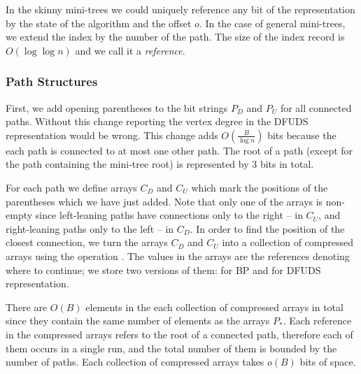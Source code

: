 In the skinny mini-trees we could uniquely reference any bit of the representation by the state of the algorithm and the offset $o$.
In the case of general mini-trees, we extend the index by the number of the path.
The size of the index record is $O(\log \log n)$ and we call it a \emph{reference}.

\subsubsection{Path Structures}

First, we add opening parentheses to the bit strings $P_D$ and $P_U$ for all connected paths.
Without this change reporting the vertex degree in the DFUDS representation would be wrong.
This change adds $O(\frac{B}{\log n})$ bits because the each path is connected to at most one other path.
The root of a path (except for the path containing the mini-tree root) is represented by $3$ bits in total.

For each path we define arrays $C_D$ and $C_U$ which mark the positions of the parentheses which we have just added.
Note that only one of the arrays is non-empty since left-leaning paths have connections only to the right -- in $C_U$, and right-leaning paths only to the left -- in $C_D$.
In order to find the position of the closest connection, we turn the arrays $C_D$ and $C_U$ into a collection of compressed arrays using the operation \succ{}.
The values in the arrays are the references denoting where to continue; we store two versions of them: for BP and for DFUDS representation.

There are $O(B)$ elements in the each collection of compressed arrays in total since they contain the same number of elements as the arrays $P_*$.
Each reference in the compressed arrays refers to the root of a connected path, therefore each of them occurs in a single run, and the total number of them is bounded by the number of paths.
Each collection of compressed arrays takes $o(B)$ bits of space.


